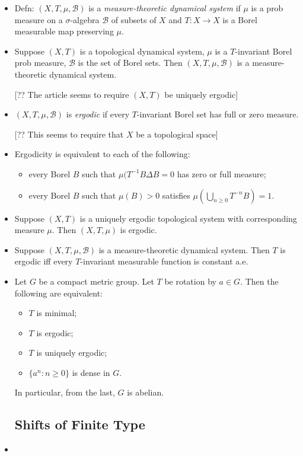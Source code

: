 \documentclass[a4paper,11pt]{amsart}
\begin{document}
\begin{itemize}
\item Defn: $ (X,T,\mu, \mathcal{B} ) $ is a  \emph{measure-theoretic dynamical system} if $ \mu $ is a prob  measure on a $ \sigma$-algebra $ \mathcal{B} $ of subsets of $ X$ and $ T:X\to X$ is a Borel measurable map preserving $ \mu $.

\item Suppose  $ (X,T) $ is a topological dynamical system, $ \mu $ is a $ T $-invariant Borel prob measure, $ \mathcal{B}  $  is the set of Borel sets.  Then  $ (X,T,\mu, \mathcal{B} ) $ is a   measure-theoretic dynamical system.

[?? The article seems to require $ (X,T) $ be uniquely ergodic]

\item $ (X,T,\mu, \mathcal{B} ) $ is \emph{ergodic} if every $ T $-invariant Borel set has full or zero measure.

[?? This seems to require that $ X$ be a topological space]

\item Ergodicity is equivalent to each of the following:
\begin{itemize}
\item every Borel $ B $ such that $ \mu(T^{-1}B \Delta B = 0 $ has zero or full measure;
\item every Borel $ B $ such that $ \mu(B)>0 $ satisfies $ \mu (\bigcup_{n\geq 0} T^{-n}B) = 1 $.
\end{itemize} 


\item Suppose $ (X,T) $ is a uniquely ergodic topological system with corresponding measure $ \mu $.  Then   $ (X,T,\mu  ) $ is ergodic.

\item Suppose $ (X,T,\mu, \mathcal{B} ) $ is a  measure-theoretic dynamical system.  Then $ T $ is ergodic iff every $ T  $-invariant measurable function is constant a.e.

\item Let $ G $ be a compact metric group.  Let $ T $ be rotation by $ a\in G $.
Then the following are equivalent:
\begin{itemize}
\item $ T $ is minimal;
\item $ T $ is ergodic;
\item $ T $ is uniquely ergodic;
\item $ \{a^n: n \geq 0 \} $ is dense in $ G $.
\end{itemize}
In particular, from the last, $ G $ is abelian.


\subsection{Shifts of Finite Type}

\item 

\end{itemize} 
\end{document}
